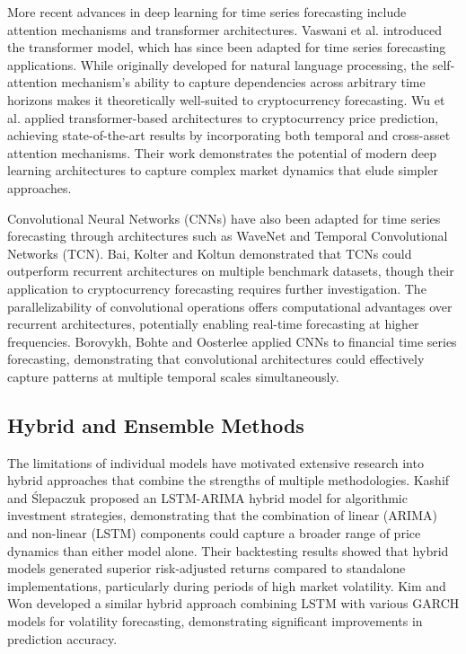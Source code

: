 \documentclass[conference]{IEEEtran}
\begin{document}
More recent advances in deep learning for time series forecasting include attention mechanisms and transformer architectures. Vaswani et al. \cite{vaswani2017} introduced the transformer model, which has since been adapted for time series forecasting applications. While originally developed for natural language processing, the self-attention mechanism's ability to capture dependencies across arbitrary time horizons makes it theoretically well-suited to cryptocurrency forecasting. Wu et al. \cite{wu2023} applied transformer-based architectures to cryptocurrency price prediction, achieving state-of-the-art results by incorporating both temporal and cross-asset attention mechanisms. Their work demonstrates the potential of modern deep learning architectures to capture complex market dynamics that elude simpler approaches.

Convolutional Neural Networks (CNNs) have also been adapted for time series forecasting through architectures such as WaveNet and Temporal Convolutional Networks (TCN). Bai, Kolter and Koltun \cite{bai2018} demonstrated that TCNs could outperform recurrent architectures on multiple benchmark datasets, though their application to cryptocurrency forecasting requires further investigation. The parallelizability of convolutional operations offers computational advantages over recurrent architectures, potentially enabling real-time forecasting at higher frequencies. Borovykh, Bohte and Oosterlee \cite{borovykh2017} applied CNNs to financial time series forecasting, demonstrating that convolutional architectures could effectively capture patterns at multiple temporal scales simultaneously.

\subsection{Hybrid and Ensemble Methods}

The limitations of individual models have motivated extensive research into hybrid approaches that combine the strengths of multiple methodologies. Kashif and \'Slepaczuk \cite{kashif2024} proposed an LSTM-ARIMA hybrid model for algorithmic investment strategies, demonstrating that the combination of linear (ARIMA) and non-linear (LSTM) components could capture a broader range of price dynamics than either model alone. Their backtesting results showed that hybrid models generated superior risk-adjusted returns compared to standalone implementations, particularly during periods of high market volatility. Kim and Won \cite{kim2018} developed a similar hybrid approach combining LSTM with various GARCH models for volatility forecasting, demonstrating significant improvements in prediction accuracy.
\end{document}
